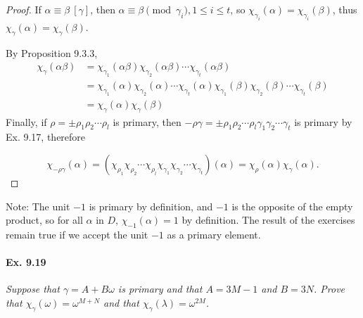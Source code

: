 \documentclass[11pt,a4paper]{article}
\begin{document}
\begin{proof}
If $\alpha \equiv \beta\ [\gamma]$, then $\alpha \equiv \beta\pmod {\gamma_i}, 1 \leq i \leq t$, so $\chi_{\gamma_i}(\alpha) = \chi_{\gamma_i}(\beta)$, thus $\chi_\gamma(\alpha) = \chi_\gamma(\beta)$.

By Proposition 9.3.3,
\begin{align*}
\chi_\gamma(\alpha \beta) &= \chi_{\gamma_1}(\alpha \beta)\chi_{\gamma_2}(\alpha \beta)\cdots\chi_{\gamma_t}(\alpha \beta)\\
&= \chi_{\gamma_1}(\alpha)\chi_{\gamma_2}(\alpha)\cdots\chi_{\gamma_t}(\alpha)\chi_{\gamma_1}(\beta)\chi_{\gamma_2}(\beta)\cdots\chi_{\gamma_t}(\beta)\\
&= \chi_\gamma(\alpha) \chi_{\gamma}(\beta)
\end{align*}
Finally, if $\rho = \pm \rho_1\rho_2\cdots\rho_l$ is primary, then $-\rho \gamma = \pm \rho_1\rho_2\cdots\rho_l\gamma_1\gamma_2\cdots\gamma_t$ is primary by Ex. 9.17, therefore

$$\chi_{-\rho \gamma}(\alpha) = (\chi_{\rho_1} \chi_{\rho_2}\cdots \chi_{\rho_l}\chi_{\gamma_1} \chi_{\gamma_2}\cdots \chi_{\gamma_t} )(\alpha)= \chi_\rho(\alpha)\chi_\gamma(\alpha).$$
\end{proof}

Note: The unit $-1$ is primary by definition, and $-1$ is the opposite of the empty product, so for all $\alpha$ in $D$, $\chi_{-1}(\alpha) = 1$ by definition. The result of the exercises remain true if we accept the unit $-1$ as a primary element.


\paragraph{Ex. 9.19}

{\it Suppose that $\gamma = A + B \omega$ is primary and that $A = 3M-1$ and $B = 3N$. Prove that $\chi_\gamma(\omega) = \omega^{M+N}$ and that $\chi_\gamma(\lambda) = \omega^{2M}$.
}
\end{document}
